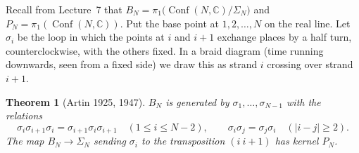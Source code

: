 \documentclass[11pt,openany]{book}
\theoremstyle{plain}
\newtheorem{theorem}{Theorem}[chapter]
\theoremstyle{definition}
\theoremstyle{remark}
\newcommand{\C}{\mathbb{C}}
\newcommand{\Conf}{\operatorname{Conf}}
\newcommand{\abs}[1]{\left\lvert #1 \right\rvert}
\begin{document}
Recall from Lecture~7 that $B_N=\pi_1\big(\Conf(N,\C)/\Sigma_N\big)$ and $P_N=\pi_1(\Conf(N,\C))$. Put the base
point at $1,2,\dots,N$ on the real line. Let $\sigma_i$ be the loop in which the points at $i$ and $i+1$
exchange places by a half turn, counterclockwise, with the others fixed. In a braid diagram (time
running downwards, seen from a fixed side) we draw this as strand $i$ crossing over strand $i+1$.

\begin{theorem}[Artin 1925, 1947]\label{TOP:thm:artin}
$B_N$ is generated by $\sigma_1,\dots,\sigma_{N-1}$ with the relations
\[
  \sigma_i\sigma_{i+1}\sigma_i=\sigma_{i+1}\sigma_i\sigma_{i+1}\quad(1\le i\le N-2),\qquad
  \sigma_i\sigma_j=\sigma_j\sigma_i\quad(\abs{i-j}\ge2).
\]
The map $B_N\to\Sigma_N$ sending $\sigma_i$ to the transposition $(i\ i{+}1)$ has kernel $P_N$.
\end{theorem}
\end{document}
